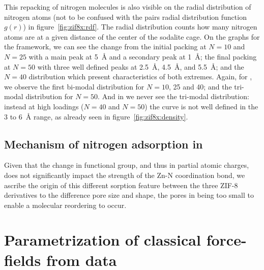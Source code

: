\documentclass[thesis]{subfiles}
\begin{document}
This repacking of nitrogen molecules is also visible on the radial distribution
of nitrogen atoms (not to be confused with the pairs radial distribution
function $g(r)$) in figure~\ref{fig:zif8x:rdf}. The radial distribution counts
how many nitrogen atoms are at a given distance of the center of the sodalite
cage. On the graphs for the  framework, we can see the change from the
initial packing at $N = 10$ and $N = 25$ with a main peak at \SI{5}{\AA} and a
secondary peak at \SI{1}{\AA}; the final packing at $N = 50$ with three well
defined peaks at \SI{2.5}{\AA}, \SI{4.5}{\AA}, and \SI{5.5}{\AA}; and the $N =
40$ distribution which present characteristics of both extremes. Again, for
\ZIFCl, we observe the first bi-modal distribution for $N = 10$, 25 and 40; and
the tri-modal distribution for $N = 50$. And in \ZIFBr we never see the
tri-modal distribution: instead at high loadings ($N = 40$ and $N = 50$) the
curve is not well defined in the 3 to \SI{6}{\AA} range, as already seen in
figure~\ref{fig:zif8x:density}.

\subsection{Mechanism of nitrogen adsorption in }

Given that the change in functional group, and thus in partial atomic charges,
does not significantly impact the strength of the Zn-N coordination bond, we
ascribe the origin of this different sorption feature between the three ZIF-8
derivatives to the difference pore size and shape, the pores in \ZIFBr being
too small to enable a molecular reordering to occur.

\TODO

\section{Parametrization of classical force-fields from \abinitio data}

\OnlyInSubfile{\printbibliography}
\end{document}
